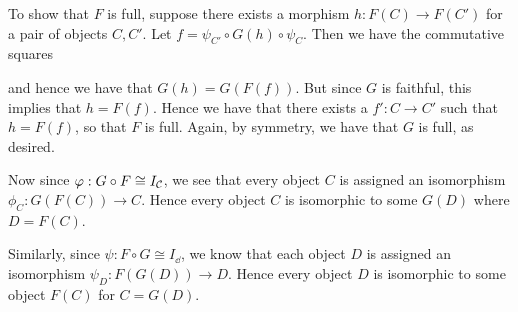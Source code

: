 \begin{prf}
\begin{description}
            To show that $F$ is full, suppose there exists a morphism
            $h: F(C) \to F(C')$ for a pair of objects $C, C'$. Let $f
            = \psi_{C'} \circ G(h) \circ \psi_C$. Then we have the
            commutative squares
            \begin{center}
                \hspace{1cm}
            \end{center}
            and hence we have that $G(h) = G(F(f))$. But since $G$ is faithful, 
            this implies that $h = F(f)$. Hence we have that there
            exists a $f': C \to C'$ such that $h = F(f)$, so that $F$
            is full. Again, by symmetry, we have that $G$ is full,
            as desired. 

            Now since $\varphi: G \circ F \cong I_{\mathcal{C}}$, we see that every
            object $C$ is assigned an isomorphism $\phi_C: G(F(C)) \to
            C$. Hence every object $C$ is isomorphic to some $G(D)$
            where $D = F(C)$. 
            
            Similarly, since $\psi: F \circ G \cong I_\dd$, we know
            that each object $D$ is assigned an isomorphism $\psi_D:
            F(G(D)) \to D$. Hence every object $D$ is isomorphic to
            some object $F(C)$ for $C = G(D)$. 


\end{description}
\end{prf}
